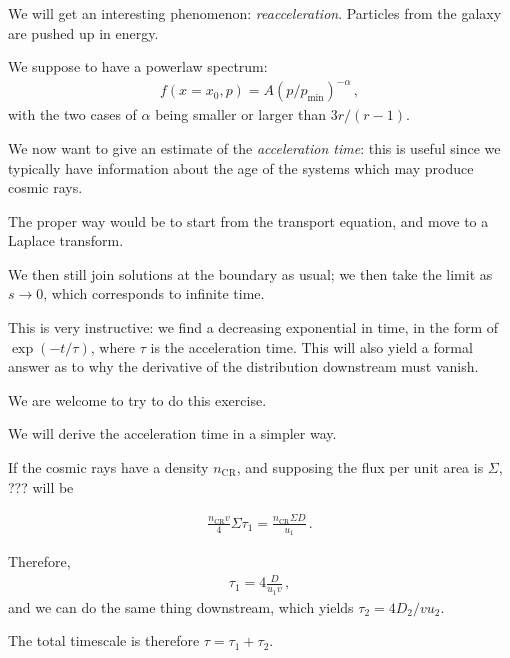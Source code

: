 \documentclass[main.tex]{subfiles}
\begin{document}
We will get an interesting phenomenon: \emph{reacceleration}. 
Particles from the galaxy are pushed up in energy. 

We suppose to have a powerlaw spectrum: 
%
\begin{align}
f(x = x_0 , p) = A (p / p _{\text{min}})^{-\alpha }
\,,
\end{align}
%
with the two cases of \(\alpha \) being smaller or larger than \(3r / (r-1)\). 

We now want to give an estimate of the \emph{acceleration time}: 
this is useful since we typically have information about the age 
of the systems which may produce cosmic rays. 

The proper way would be to start from the transport equation, 
and move to a Laplace transform. 

We then still join solutions at the boundary as usual; 
we then take the limit as \(s \to 0\), which corresponds to infinite time. 

This is very instructive: we find a decreasing exponential in time, 
in the form of \(\exp(-t / \tau )\), where \(\tau \) is the acceleration time. 
This will also yield a formal answer as to why the derivative of the distribution downstream must vanish.

\begin{extracontent}
We are welcome to try to do this exercise.
\end{extracontent}

We will derive the acceleration time in a simpler way. 

If the cosmic rays have a density \(n _{\text{CR}}\), and supposing the flux per unit area is \(\Sigma \), ??? will be 

%
\begin{align}
\frac{n_{\text{CR}} v}{4} \Sigma \tau_1 = \frac{n _{\text{CR}} \Sigma D }{u_1 }
\,.
\end{align}

Therefore, 
%
\begin{align}
\tau_1 = 4 \frac{D}{u_1 v} 
\,,
\end{align}
%
and we can do the same thing downstream, which yields \(\tau_2 = 4 D_2 / v u_2 \). 

The total timescale is therefore \(\tau = \tau_1 + \tau_2 \). 
\end{document}
